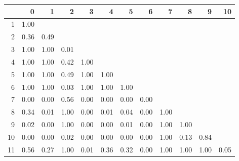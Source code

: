 % 
\begin{tabular}{rrrrrrrrrrrr}
  \hline
 & 0 & 1 & 2 & 3 & 4 & 5 & 6 & 7 & 8 & 9 & 10 \\ 
  \hline
1 & 1.00 &  &  &  &  &  &  &  &  &  &  \\ 
  2 & 0.36 & 0.49 &  &  &  &  &  &  &  &  &  \\ 
  3 & 1.00 & 1.00 & 0.01 &  &  &  &  &  &  &  &  \\ 
  4 & 1.00 & 1.00 & 0.42 & 1.00 &  &  &  &  &  &  &  \\ 
  5 & 1.00 & 1.00 & 0.49 & 1.00 & 1.00 &  &  &  &  &  &  \\ 
  6 & 1.00 & 1.00 & 0.03 & 1.00 & 1.00 & 1.00 &  &  &  &  &  \\ 
  7 & 0.00 & 0.00 & 0.56 & 0.00 & 0.00 & 0.00 & 0.00 &  &  &  &  \\ 
  8 & 0.34 & 0.01 & 1.00 & 0.00 & 0.01 & 0.04 & 0.00 & 1.00 &  &  &  \\ 
  9 & 0.02 & 0.00 & 1.00 & 0.00 & 0.00 & 0.01 & 0.00 & 1.00 & 1.00 &  &  \\ 
  10 & 0.00 & 0.00 & 0.02 & 0.00 & 0.00 & 0.00 & 0.00 & 1.00 & 0.13 & 0.84 &  \\ 
  11 & 0.56 & 0.27 & 1.00 & 0.01 & 0.36 & 0.32 & 0.00 & 1.00 & 1.00 & 1.00 & 0.05 \\ 
   \hline
\end{tabular}
% 
